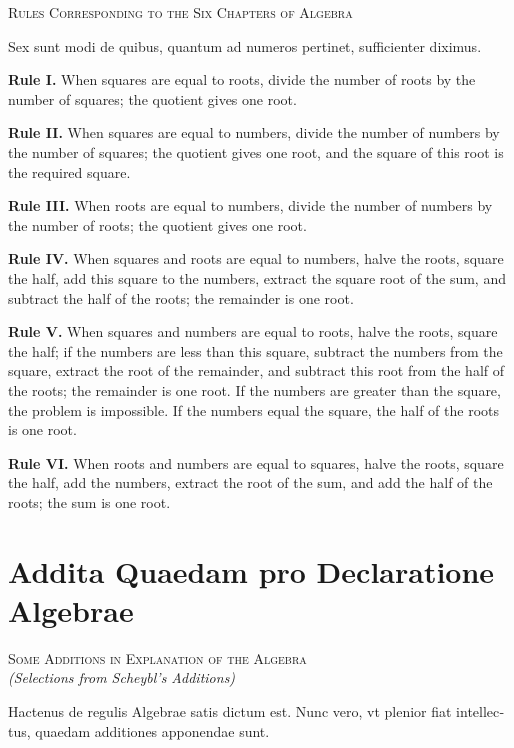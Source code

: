 \documentclass[11pt,a4paper]{book}
\begin{document}
\begin{center}
\textsc{Rules Corresponding to the Six Chapters of Algebra}
\end{center}

\textlatin{Sex sunt modi de quibus, quantum ad numeros pertinet, sufficienter diximus.}

\smallskip

\textbf{Rule I.} When squares are equal to roots, divide the number of roots by the number of squares; the quotient gives one root.

\textbf{Rule II.} When squares are equal to numbers, divide the number of numbers by the number of squares; the quotient gives one root, and the square of this root is the required square.

\textbf{Rule III.} When roots are equal to numbers, divide the number of numbers by the number of roots; the quotient gives one root.

\textbf{Rule IV.} When squares and roots are equal to numbers, halve the roots, square the half, add this square to the numbers, extract the square root of the sum, and subtract the half of the roots; the remainder is one root.

\textbf{Rule V.} When squares and numbers are equal to roots, halve the roots, square the half; if the numbers are less than this square, subtract the numbers from the square, extract the root of the remainder, and subtract this root from the half of the roots; the remainder is one root. If the numbers are greater than the square, the problem is impossible. If the numbers equal the square, the half of the roots is one root.

\textbf{Rule VI.} When roots and numbers are equal to squares, halve the roots, square the half, add the numbers, extract the root of the sum, and add the half of the roots; the sum is one root.

\chapter*{Addita Quaedam pro Declaratione Algebrae}

\begin{center}
\textsc{Some Additions in Explanation of the Algebra}\\
\textit{(Selections from Scheybl's Additions)}
\end{center}

\textlatin{Hactenus de regulis Algebrae satis dictum est. Nunc vero, vt plenior fiat intellectus, quaedam additiones apponendae sunt.}
\end{document}
